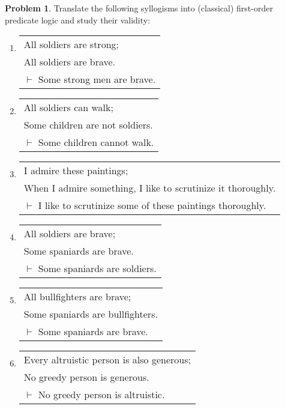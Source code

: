 \documentclass[a4paper]{article}
\theoremstyle{definition}
\newtheorem{prob}{Problem}
\begin{document}
\begin{prob}Translate the following syllogisms into (classical) first-order
predicate logic and study their validity:

\begin{enumerate}

\item \begin{tabular}[t]{l} 
     All soldiers are strong;\\
     All soldiers are brave.\\
     $\vdash$ Some strong men are brave.
     \end{tabular}

\item \begin{tabular}[t]{l}
     All soldiers can walk;\\
     Some children are not soldiers.\\
     $\vdash$ Some children cannot walk.
     \end{tabular}

\item \begin{tabular}[t]{l}
     I admire these paintings;\\
     When I admire something, I like to scrutinize it thoroughly.\\
     $\vdash$ I like to scrutinize some of these paintings thoroughly.
     \end{tabular}

\item \begin{tabular}[t]{l}
     All soldiers are brave;\\
     Some spaniards are brave.\\
     $\vdash$ Some spaniards are soldiers.
     \end{tabular}

\item \begin{tabular}[t]{l}
     All bullfighters are brave;\\
     Some spaniards are bullfighters.\\
     $\vdash$ Some spaniards are brave.
     \end{tabular}

\item \begin{tabular}[t]{l}
     Every altruistic person is also generous;\\
     No greedy person is generous.\\
     $\vdash$ No greedy person is altruistic.
     \end{tabular}

\end{enumerate}
\end{prob}
\end{document}
